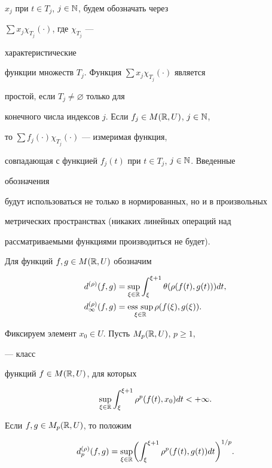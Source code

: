 $x_j$ при $t\in T_j$, $j\in\Bbb N$, будем обозначать через


$\sum x_j\chi_{T_j}(\cdot)$, где $\chi_{T_j}$ ---


характеристические


функции множеств $T_j$. Функция $\sum x_j\chi_{T_j}(\cdot)$ является


простой, если $T_j\ne\varnothing$ только для


конечного числа индексов $j$. Если $f_j\in M(\Bbb R,U)$, $j\in\Bbb N$,


то $\sum f_j(\cdot)\chi_{T_j}(\cdot)$ --- измеримая функция,


совпадающая с функцией $f_j(t)$ при $t\in T_j$, $j\in\Bbb N$. Введенные


обозначения


будут использоваться не только в нормированных, но и в произвольных


метрических пространствах (никаких линейных операций над


рассматриваемыми функциями производиться не будет).





Для функций $f,g\in M(\Bbb R,U)$ обозначим


\begin{align*}


d^{(\rho)}(f,g)&=\sup_{\xi\in\Bbb R}\int^{\xi+1}_\xi


\theta(\rho(f(t),g(t)))dt,\\


d^{(\rho)}_\infty(f,g)&=\esssup_{\xi\in\Bbb R}\rho(f(\xi),g(\xi)).


\end{align*}


Фиксируем элемент $x_0\in U$. Пусть $M_p(\Bbb R,U)$, $p\ge 1$,


--- класс


функций $f\in M(\Bbb R,U)$, для которых


$$


\sup_{\xi\in\Bbb R}\int^{\xi+1}_\xi \rho^p(f(t),x_0)dt


<+\infty.


$$


Если $f,g\in M_p(\Bbb R,U)$, то положим


$$


d^{(\rho)}_p(f,g)=\sup_{\xi\in\Bbb R}\biggl(


\int^{\xi+1}_\xi \rho^p(f(t),g(t))dt\biggr)^{1/p}.


$$


